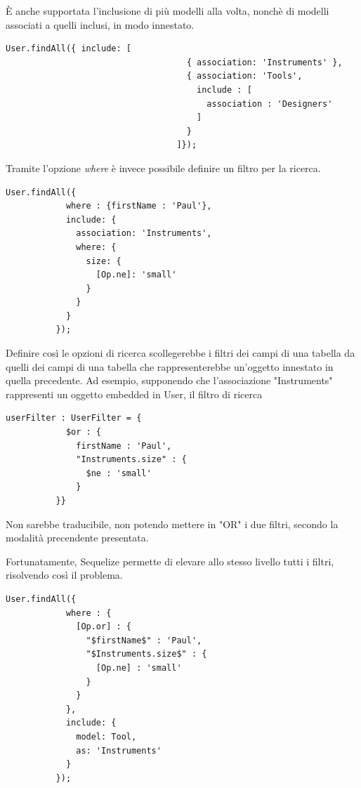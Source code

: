 \documentclass[a4paper, 12pt]{scrartcl}
\begin{document}
        È anche supportata l'inclusione di più modelli alla volta, nonchè di modelli associati a quelli inclusi, in modo innestato.
        \begin{Verbatim}[samepage=true]
          User.findAll({ include: [
                                    { association: 'Instruments' }, 
                                    { association: 'Tools', 
                                      include : [
                                        association : 'Designers'
                                      ]
                                    }
                                  ]});
        \end{Verbatim}

        Tramite l'opzione \emph{where} è invece possibile definire un filtro per la ricerca.
        \begin{Verbatim}[samepage=true]
          User.findAll({
            where : {firstName : 'Paul'},
            include: {
              association: 'Instruments',
              where: {
                size: {
                  [Op.ne]: 'small'
                }
              }
            }
          });
        \end{Verbatim}

        Definire così le opzioni di ricerca scollegerebbe i filtri dei campi di una tabella da quelli dei campi di una tabella che rappresenterebbe un'oggetto innestato in quella precedente.
        Ad esempio, supponendo che l'associazione "Instruments" rappresenti un oggetto embedded in User, il filtro di ricerca
        \begin{Verbatim}[samepage=true]
          userFilter : UserFilter = {
            $or : {
              firstName : 'Paul', 
              "Instruments.size" : {
                $ne : 'small'
              }
          }}
        \end{Verbatim}
        Non sarebbe traducibile, non potendo mettere in "OR" i due filtri, secondo la modalità precendente presentata.
          
        Fortunatamente, Sequelize permette di elevare allo stesso livello tutti i filtri, risolvendo così il problema.
        \begin{Verbatim}[samepage=true]
          User.findAll({
            where : {
              [Op.or] : {
                "$firstName$" : 'Paul', 
                "$Instruments.size$" : {
                  [Op.ne] : 'small'
                }
              }
            },
            include: {
              model: Tool,
              as: 'Instruments'
            }
          });
        \end{Verbatim}
\end{document}
